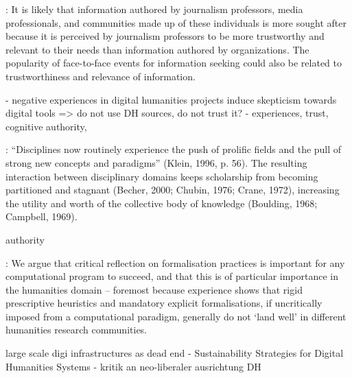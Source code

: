 \documentclass[12pt, a4paper, titlepage, oneside, abstract=true, toc=listof, toc=bibliography, BCOR=1cm]{scrreprt}
\begin{document}
{%
\citep{Hepworth2017}: It is likely that information authored by journalism professors, media professionals,
and communities made up of these individuals is more sought after because it is perceived by journalism professors to be more trustworthy and relevant to their needs than information authored by organizations. The popularity of face-to-face events for information seeking could also be related to trustworthiness and relevance of information.



- negative experiences in digital humanities projects induce skepticism towards digital tools => do not use DH sources, do not trust it?
- experiences, trust, cognitive authority, 

\citep[p. 173]{Palmer2009}: “Disciplines now routinely experience the push of prolific fields and the pull of strong new concepts and paradigms” (Klein, 1996, p. 56). The resulting interaction between disciplinary domains keeps scholarship from becoming partitioned and stagnant (Becher, 2000; Chubin, 1976; Crane, 1972), increasing the utility and worth of the collective body of knowledge (Boulding, 1968; Campbell, 1969).

authority \citep{Wilson1983}

\citep{VanZundert2012}: We argue that critical reflection on formalisation practices is important for any computational program to succeed, and that this is of particular importance in the humanities domain – foremost because experience shows that rigid prescriptive heuristics and mandatory explicit formalisations, if uncritically imposed from a computational paradigm, generally do not ‘land well’ in different humanities
research communities.

\cite{Zundert2012} large scale digi infrastructures as dead end
\cite{Neuefeind2020} - Sustainability Strategies for Digital Humanities Systems
\citep{Barker2012} - kritik an neo-liberaler ausrichtung DH


}
\end{document}
